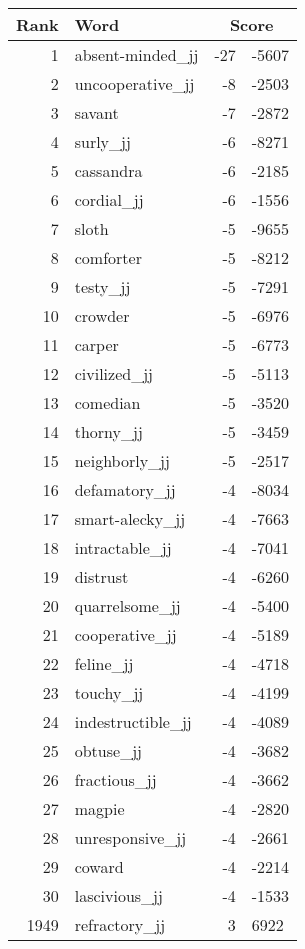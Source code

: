 \begin{longtable}[!htbp]{| rlr@{.}l |}
    \hline
    \textbf{Rank} & \textbf{Word} & \multicolumn{2}{c|}{\textbf{Score}} \\
    \hline
    \endhead
    1 & absent-minded\_jj & -27 & -5607 \\
    2 & uncooperative\_jj & -8 & -2503 \\
    3 & savant & -7 & -2872 \\
    4 & surly\_jj & -6 & -8271 \\
    5 & cassandra & -6 & -2185 \\
    6 & cordial\_jj & -6 & -1556 \\
    7 & sloth & -5 & -9655 \\
    8 & comforter & -5 & -8212 \\
    9 & testy\_jj & -5 & -7291 \\
    10 & crowder & -5 & -6976 \\
    11 & carper & -5 & -6773 \\
    12 & civilized\_jj & -5 & -5113 \\
    13 & comedian & -5 & -3520 \\
    14 & thorny\_jj & -5 & -3459 \\
    15 & neighborly\_jj & -5 & -2517 \\
    16 & defamatory\_jj & -4 & -8034 \\
    17 & smart-alecky\_jj & -4 & -7663 \\
    18 & intractable\_jj & -4 & -7041 \\
    19 & distrust & -4 & -6260 \\
    20 & quarrelsome\_jj & -4 & -5400 \\
    21 & cooperative\_jj & -4 & -5189 \\
    22 & feline\_jj & -4 & -4718 \\
    23 & touchy\_jj & -4 & -4199 \\
    24 & indestructible\_jj & -4 & -4089 \\
    25 & obtuse\_jj & -4 & -3682 \\
    26 & fractious\_jj & -4 & -3662 \\
    27 & magpie & -4 & -2820 \\
    28 & unresponsive\_jj & -4 & -2661 \\
    29 & coward & -4 & -2214 \\
    30 & lascivious\_jj & -4 & -1533 \\
    1949 & refractory\_jj & 3 & 6922 \\

\end{longtable}
